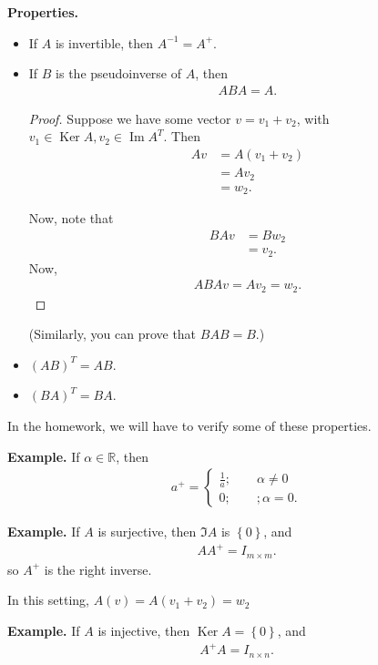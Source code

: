 \documentclass{article}
\newcommand{\RR}{\mathbb{R}}
\DeclareMathOperator{\Ker}{Ker}
\DeclareMathOperator{\Ima}{Im}
\DeclareMathOperator{\Ima}{Im}
\begin{document}
{\bf Properties.}
\begin{itemize}
  \item If $A$ is invertible, then $A^{-1} = A^{+}$.
  \item If $B$ is the pseudoinverse of $A$, then
    \begin{align*}
      A B A = A.
    \end{align*}

    \begin{proof}
      Suppose we have some vector $v = v_1 + v_2$, with $v_1 \in \Ker A, v_2 \in \Ima A^{T}$.  Then
      \begin{align*}
        Av &= A(v_1 + v_2) \\
        &= Av_2 \\
        &= w_2.
      \end{align*}

      Now, note that 
      \begin{align*}
        BAv &= B w_2 \\
        &= v_2.
      \end{align*}
      Now,
      \begin{align*}
        ABAv = A v_2 = w_2.
      \end{align*}
    \end{proof}

    (Similarly, you can prove that $BAB = B$.)
  \item $(AB)^{T} = AB$.
  \item $(BA)^{T} = BA$.
\end{itemize}

In the homework, we will have to verify some of these properties.


{\bf Example.} If $\alpha \in \RR$, then
    \begin{align*}
      a^{+} =
      \begin{cases}
        \frac{1}{a}; \qquad \alpha \neq 0 \\
        0; \qquad; \alpha = 0.
      \end{cases}
    \end{align*} 

    {\bf Example.} If $A$ is surjective, then $\Im A$ is $\left\{ 0 \right\}$, and
    \begin{align*}
      A A^{+} = I_{m \times m}.
    \end{align*}
    so $A^{+}$ is the right inverse.

    In this setting, $A(v) = A(v_1 + v_2) = w_2$

    {\bf Example.} If $A$ is injective, then $\Ker A = \left\{ 0 \right\}$, and
    \begin{align*}
      A^{+} A = I_{n \times n}.
    \end{align*}
\end{document}
